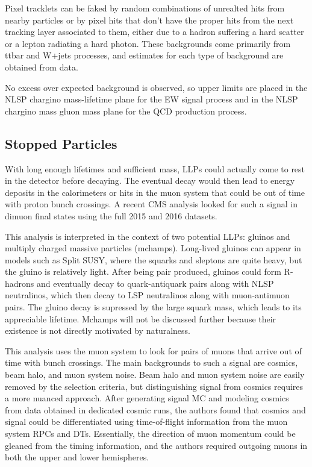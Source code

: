 \documentclass[12pt]{article}
\begin{document}
            Pixel tracklets can be faked by random combinations of unrealted hits from nearby particles or by pixel hits that don't have the proper hits from the next tracking layer associated to them, either due to a hadron suffering a hard scatter or a lepton radiating a hard photon. These backgrounds come primarily from ttbar and W+jets processes, and estimates for each type of background are obtained from data.

            No excess over expected background is observed, so upper limits are placed in the NLSP chargino mass-lifetime plane for the EW signal process and in the NLSP chargino mass gluon mass plane for the QCD production process.

\subsection{Stopped Particles}
            With long enough lifetimes and sufficient mass, LLPs could actually come to rest in the detector before decaying. The eventual decay would then lead to energy deposits in the calorimeters or hits in the muon system that could be out of time with proton bunch crossings. A recent CMS analysis looked for such a signal in dimuon final states using the full 2015 and 2016 datasets. 

            This analysis is interpreted in the context of two potential LLPs: gluinos and multiply charged massive particles (mchamps). Long-lived gluinos can appear in models such as Split SUSY, where the squarks and sleptons are quite heavy, but the gluino is relatively light. After being pair produced, gluinos could form R-hadrons and eventually decay to quark-antiquark pairs along with NLSP neutralinos, which then decay to LSP neutralinos along with muon-antimuon pairs. The gluino decay is supressed by the large squark mass, which leads to its appreciable lifetime. Mchamps will not be discussed further because their existence is not directly motivated by naturalness.

            This analysis uses the muon system to look for pairs of muons that arrive out of time with bunch crossings. The main backgrounds to such a signal are cosmics, beam halo, and muon system noise. Beam halo and muon system noise are easily removed by the selection criteria, but distinguishing signal from cosmics requires a more nuanced approach. After generating signal MC and modeling cosmics from data obtained in dedicated cosmic runs, the authors found that cosmics and signal could be differentiated using time-of-flight information from the muon system RPCs and DTs. Essentially, the direction of muon momentum could be gleaned from the timing information, and the authors required outgoing muons in both the upper and lower hemispheres.
            
\end{document}
